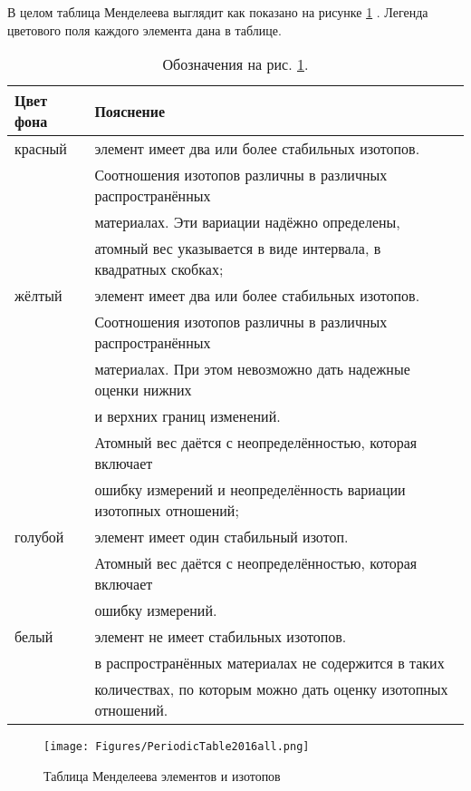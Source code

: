 \documentclass[a5paper,openany]{book}
\begin{document}
В целом таблица Менделеева выглядит как показано на рисунке \ref{f:PeriodicTable} \cite{IUPAC}.
Легенда цветового поля каждого элемента дана в таблице.\\
\begin{table}
	{\footnotesize 
		\begin{tabular}{ll}
			Цвет фона & Пояснение \\
			\hline	
			красный & элемент имеет два или более стабильных изотопов. \\
			~ &	Соотношения изотопов различны в различных распространённых  \\
			~ & материалах. Эти вариации надёжно определены, \\
			~ &  атомный вес указывается в виде интервала, в квадратных скобках; \\
			\hline
			жёлтый & элемент имеет два или более стабильных изотопов. \\
			~ & Соотношения изотопов различны в различных распространённых  \\
			~ & материалах. При этом невозможно дать надежные оценки нижних  \\
			~& и верхних границ изменений. \\
			~ & Атомный вес даётся с неопределённостью, которая включает  \\
			~ & ошибку измерений и неопределённость вариации изотопных отношений; \\
			\hline
			голубой& элемент имеет один стабильный изотоп.  \\
			~ & Атомный вес даётся с неопределённостью, которая включает\\ 
			~ & ошибку измерений. \\
			\hline	
			белый & элемент не имеет стабильных изотопов.	\\
			~ & в распространённых материалах не содержится в таких  \\
			~ & количествах, по которым можно дать оценку изотопных отношений.\\
			\hline
		\end{tabular} 
		\caption{Обозначения на рис. \ref{f:PeriodicTable}.}
	}
\end{table}

\begin{figure}[ht] 
	\centering\small
	\unitlength=1mm
	\texttt{[image: Figures/PeriodicTable2016all.png]} 
	\caption{Таблица Менделеева элементов и изотопов \cite{IUPAC}} 
	\label{f:PeriodicTable}
\end{figure}
\end{document}
